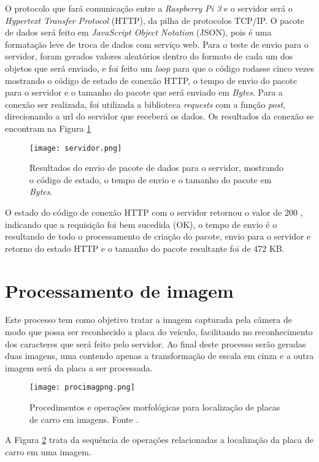        
 O protocolo que fará comunicação entre a \emph{Raspberry Pi 3} e o servidor será o \emph{Hypertext Transfer Protocol} (HTTP), da pilha de protocolos TCP/IP. O pacote de dados será feito em \emph{JavaScript Object Notation} (JSON), pois é uma formatação leve de troca de dados com serviço web. Para o teste de envio para o servidor, foram gerados valores aleatórios dentro do formato de cada um dos objetos que será enviado, e foi feito um \emph{loop} para que o código rodasse cinco vezes mostrando o código de estado de conexão HTTP, o tempo de envio do pacote para o servidor e o tamanho do pacote que será enviado em \emph{Bytes}. Para a conexão ser realizada, foi utilizada a biblioteca \emph{requests} com a função \emph{post}, direcionando a url do servidor que receberá os dados. Os resultados da conexão se encontram na Figura \ref{servidor}
 
  \begin{figure}[H]
    \centering
    \texttt{[image: servidor.png]}
    \caption{Resultados do envio de pacote de dados para o servidor, mostrando o código de estado, o tempo de envio e o tamanho do pacote em \emph{Bytes}.}
    \label{servidor}
\end{figure}

O estado do código de conexão HTTP com o servidor retornou o valor de 200 , indicando que a requisição foi bem sucedida (OK), o tempo de envio é o resultando de todo o processamento de criação do pacote, envio para o servidor e retorno do estado HTTP e o tamanho do pacote resultante foi de 472 KB.

\section{Processamento de imagem}

Este processo tem como objetivo tratar a imagem capturada pela câmera de modo que possa ser reconhecido a placa do veículo, facilitando no reconhecimento dos caracteres que será feito pelo servidor. Ao final deste processo serão geradas duas imagens, uma contendo apenas a transformação de escala em cinza e a outra imagem será da placa a ser processada.
\begin{figure}[H]
    \centering
    \texttt{[image: procimagpng.png]}    \caption{Procedimentos e operações morfológicas para localização de placas de carro em imagens. Fonte \cite{Localisation}.}
    \label{fig:proc_img}
\end{figure}
A Figura \ref{fig:proc_img} trata da sequência de operações relacionadas a localização da placa de carro em uma imagem. 

